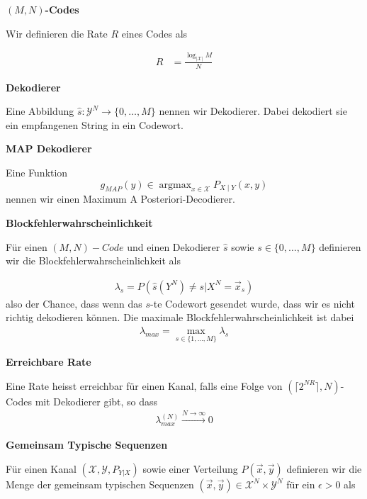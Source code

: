 \documentclass[25pt]{sciposter}
\renewcommand{\hat}{\widehat}
\newenvironment{defn}[1]{\begin{mdframed}[backgroundcolor=blue!10,innertopmargin=15pt, nobreak=true,innerbottommargin=15pt]
		\textbf{#1 }
	}
	{ 
	\end{mdframed}
}
\begin{document}
\begin{multicols}{3}
\begin{defn}{$(M,N)$-Codes}
Wir definieren die Rate $R$ eines Codes als

\begin{align*}
	R &= \frac{\log_{|\mathcal{X}|} M }{N}
\end{align*}

\end{defn}



\begin{defn}{Dekodierer}
	Eine Abbildung $\hat{s}:\mathcal{Y}^N \to \{0,\ldots,M\}$ nennen wir Dekodierer. Dabei dekodiert sie ein empfangenen String in ein Codewort.
\end{defn}


\begin{defn}{MAP Dekodierer}
Eine Funktion $$g_{MAP}(y) \in \operatorname{argmax}_{x\in \mathcal{X}} P_{X\mid Y}(x,y)$$ nennen wir einen Maximum A Posteriori-Decodierer.
\end{defn}

\begin{defn}{Blockfehlerwahrscheinlichkeit}
	Für einen $(M,N)-Code$ und einen Dekodierer $\hat{s}$ sowie $s\in \{0,\ldots,M\}$ definieren wir die Blockfehlerwahrscheinlichkeit als
	
	\begin{align*}
		\lambda_s = P (\hat{s}(Y^N)\neq s | X^N = \vec{x}_s)
	\end{align*}
	also der Chance, dass wenn das $s$-te Codewort gesendet wurde, dass wir es nicht richtig dekodieren können.
	Die maximale Blockfehlerwahrscheinlichkeit ist dabei \begin{align*}
		\lambda_{max} = \max_{s\in\{1,\ldots,M\}} \lambda_s
	\end{align*}
\end{defn}


\begin{defn}{Erreichbare Rate}
	Eine Rate heisst erreichbar für einen Kanal, falls eine Folge von $(\lceil  2^{NR}\rceil,N)$-Codes mit Dekodierer gibt, so dass\begin{align*}
		 \lambda_{max}^{(N)} \stackrel{N \to \infty}{\longrightarrow} 0
	\end{align*}
\end{defn}



\begin{defn}{Gemeinsam Typische Sequenzen}
	Für einen Kanal $(\mathcal{X}, \mathcal{Y}, P_{Y|X})$ sowie einer Verteilung $P(\vec{x}, \vec{y})$ definieren wir die Menge der gemeinsam typischen Sequenzen $(\vec{x},\vec{y}) \in \mathcal{X}^N \times \mathcal{Y}^N$ für ein $\epsilon > 0$ als 
	

\end{defn}
\end{multicols}
\end{document}

